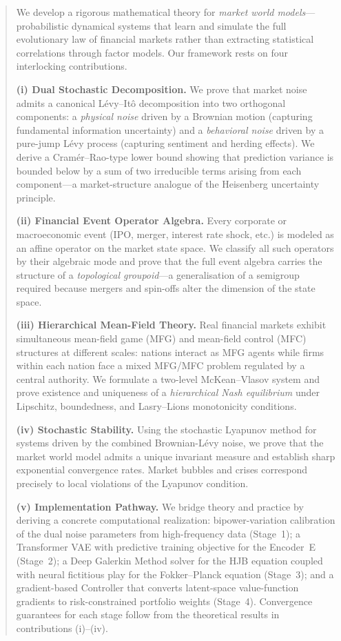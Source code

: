 \documentclass[12pt,a4paper]{article}
\theoremstyle{plain}
\theoremstyle{definition}
\newcommand{\1}{\mathbbm{1}}
\begin{document}
\begin{abstract}
We develop a rigorous mathematical theory for \emph{market world models}—
probabilistic dynamical systems that learn and simulate the full evolutionary
law of financial markets rather than extracting statistical correlations through
factor models.  Our framework rests on four interlocking contributions.

\textbf{(i) Dual Stochastic Decomposition.} We prove that market noise admits
a canonical Lévy–Itô decomposition into two orthogonal components: a
\emph{physical noise} driven by a Brownian motion (capturing fundamental
information uncertainty) and a \emph{behavioral noise} driven by a pure-jump
Lévy process (capturing sentiment and herding effects).  We derive a
Cramér–Rao-type lower bound showing that prediction variance is bounded below
by a sum of two irreducible terms arising from each component—a market-structure
analogue of the Heisenberg uncertainty principle.

\textbf{(ii) Financial Event Operator Algebra.} Every corporate or macroeconomic
event (IPO, merger, interest rate shock, etc.) is modeled as an affine
operator on the market state space.  We classify all such operators by their
algebraic mode and prove that the full event algebra carries the structure of a
\emph{topological groupoid}—a generalisation of a semigroup required because
mergers and spin-offs alter the dimension of the state space.

\textbf{(iii) Hierarchical Mean-Field Theory.} Real financial markets exhibit
simultaneous mean-field game (MFG) and mean-field control (MFC) structures at
different scales: nations interact as MFG agents while firms within each nation
face a mixed MFG/MFC problem regulated by a central authority.  We formulate a
two-level McKean–Vlasov system and prove existence and uniqueness of a
\emph{hierarchical Nash equilibrium} under Lipschitz, boundedness, and
Lasry–Lions monotonicity conditions.

\textbf{(iv) Stochastic Stability.} Using the stochastic Lyapunov method for
systems driven by the combined Brownian-Lévy noise, we prove that the market
world model admits a unique invariant measure and establish sharp exponential
convergence rates. Market bubbles and crises correspond precisely to local
violations of the Lyapunov condition.

\textbf{(v) Implementation Pathway.} We bridge theory and practice by deriving
a concrete computational realization: bipower-variation calibration of the dual
noise parameters from high-frequency data (Stage~1); a Transformer VAE with
predictive training objective for the Encoder~E (Stage~2); a Deep Galerkin
Method solver for the HJB equation coupled with neural fictitious play for the
Fokker–Planck equation (Stage~3); and a gradient-based Controller that converts
latent-space value-function gradients to risk-constrained portfolio weights
(Stage~4).  Convergence guarantees for each stage follow from the theoretical
results in contributions (i)--(iv).


\end{abstract}
\end{document}
